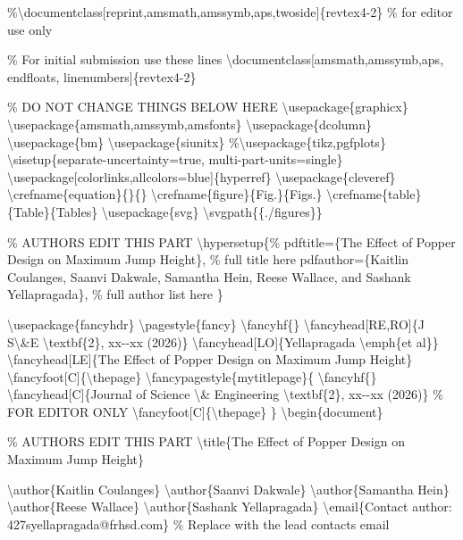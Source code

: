 \%\textbackslash documentclass{[}reprint,amsmath,amssymb,aps,twoside{]}\{revtex4-2\}
\% for editor use only

\% For initial submission use these lines
\textbackslash documentclass{[}amsmath,amssymb,aps, endfloats,
linenumbers{]}\{revtex4-2\}

\% DO NOT CHANGE THINGS BELOW HERE \textbackslash usepackage\{graphicx\}
\textbackslash usepackage\{amsmath,amssymb,amsfonts\}
\textbackslash usepackage\{dcolumn\} \textbackslash usepackage\{bm\}
\textbackslash usepackage\{siunitx\}
\%\textbackslash usepackage\{tikz,pgfplots\}
\textbackslash sisetup\{separate-uncertainty=true,
multi-part-units=single\}
\textbackslash usepackage{[}colorlinks,allcolors=blue{]}\{hyperref\}
\textbackslash usepackage\{cleveref\}
\textbackslash crefname\{equation\}\{\}\{\}
\textbackslash crefname\{figure\}\{Fig.\}\{Figs.\}
\textbackslash crefname\{table\}\{Table\}\{Tables\}
\textbackslash usepackage\{svg\} \textbackslash svgpath\{\{./figures\}\}

\% AUTHORS EDIT THIS PART \textbackslash hypersetup\{\% pdftitle=\{The
Effect of Popper Design on Maximum Jump Height\}, \% full title here
pdfauthor=\{Kaitlin Coulanges, Saanvi Dakwale, Samantha Hein, Reese
Wallace, and Sashank Yellapragada\}, \% full author list here \}

\textbackslash usepackage\{fancyhdr\} \textbackslash pagestyle\{fancy\}
\textbackslash fancyhf\{\} \textbackslash fancyhead{[}RE,RO{]}\{J
S\textbackslash\&E \textbackslash textbf\{2\}, xx-\/-xx (2026)\}
\textbackslash fancyhead{[}LO{]}\{Yellapragada \textbackslash emph\{et
al\}\} \textbackslash fancyhead{[}LE{]}\{The Effect of Popper Design on
Maximum Jump Height\}
\textbackslash fancyfoot{[}C{]}\{\textbackslash thepage\}
\textbackslash fancypagestyle\{mytitlepage\}\{
\textbackslash fancyhf\{\} \textbackslash fancyhead{[}C{]}\{Journal of
Science \textbackslash\& Engineering \textbackslash textbf\{2\},
xx-\/-xx (2026)\} \% FOR EDITOR ONLY
\textbackslash fancyfoot{[}C{]}\{\textbackslash thepage\} \}
\textbackslash begin\{document\}

\% AUTHORS EDIT THIS PART \textbackslash title\{The Effect of Popper
Design on Maximum Jump Height\}

\textbackslash author\{Kaitlin Coulanges\} \textbackslash author\{Saanvi
Dakwale\} \textbackslash author\{Samantha Hein\}
\textbackslash author\{Reese Wallace\} \textbackslash author\{Sashank
Yellapragada\} \textbackslash email\{Contact author:
427syellapragada@frhsd.com\} \% Replace with the lead
contact\textquotesingle s email

